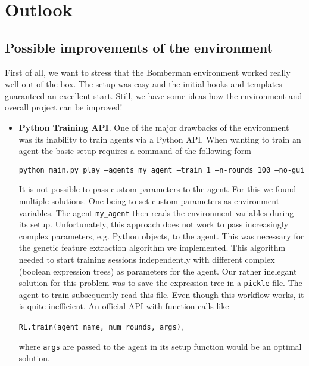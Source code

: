 \chapter{Outlook}

\section{Possible improvements of the environment}

First of all, we want to stress that the Bomberman environment worked really well out of the box. The setup was easy and the initial hooks and templates guaranteed an excellent start. Still, we have some ideas how the environment and overall project can be improved!

\begin{itemize}
	\item \textbf{Python Training API}. One of the major drawbacks of the environment was its inability to train agents via a Python API. When wanting to train an agent the basic setup requires a command of the following form
	
		\begin{center}
			\texttt{python main.py play --agents my\_agent --train 1 --n-rounds 100 --no-gui}	
		\end{center}
	
		It is not possible to pass custom parameters to the agent. For this we found multiple solutions. One being to set custom parameters as environment variables. The agent \texttt{my\_agent} then reads the environment variables during its setup. Unfortunately, this approach does not work to pass increasingly complex parameters, e.g. Python objects, to the agent. This was necessary for the genetic feature extraction algorithm we implemented. This algorithm needed to start training sessions independently with different complex (boolean expression trees) as parameters for the agent. Our rather inelegant solution for this problem was to save the expression tree in a \texttt{pickle}-file. The agent to train subsequently read this file. Even though this workflow works, it is quite inefficient. An official API with function calls like
	
		\begin{center}
			\texttt{RL.train(agent\_name, num\_rounds, args)},
		\end{center}
	
		where \texttt{args} are passed to the agent in its setup function would be an optimal solution. 
	

\end{itemize}
